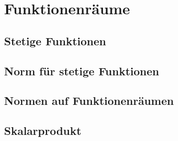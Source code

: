 %
%
%
\section{Funktionenräume
\label{buch:skalarprodukt:section:funktionenraeume}}

\subsection{Stetige Funktionen}

\subsection{Norm für stetige Funktionen}

\subsection{Normen auf Funktionenräumen}

\subsection{Skalarprodukt}






